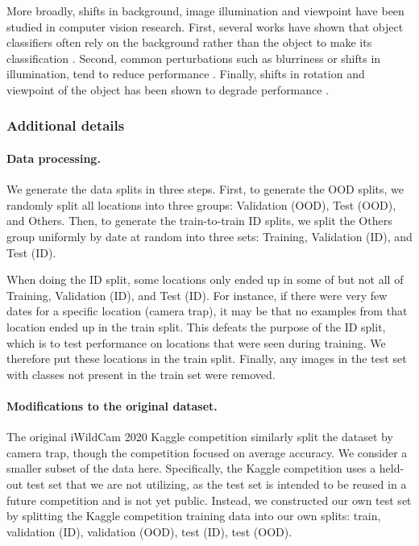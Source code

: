 More broadly, shifts in background, image illumination and viewpoint have been studied in computer vision research. First, several works have shown that object classifiers often rely on the background rather than the object to make its classification \citep{rosenfeld2018elephant, shetty2019not, xiao2020noise}. Second, common perturbations such as blurriness or shifts in illumination, tend to reduce performance \citep{dodge2017study, temel2018cure, hendrycks2019benchmarking}.
Finally, shifts in rotation and viewpoint of the object has been shown to degrade performance \citep{barbu2019objectnet}.


\subsubsection{Additional details}\label{sec:app_iwildcam_details}
\paragraph{Data processing.}
We generate the data splits in three steps. First, to generate the OOD splits, we randomly split all locations into three groups: Validation (OOD), Test (OOD), and Others. Then, to generate the train-to-train ID splits, we split the Others group uniformly by date at random into three sets: Training, Validation (ID), and Test (ID).

When doing the ID split, some locations only ended up in some of but not all of Training, Validation (ID), and Test (ID). For instance, if there were very few dates for a specific location (camera trap), it may be that no examples from that location ended up in the train split. This defeats the purpose of the ID split, which is to test performance on locations that were seen during training. We therefore put these locations in the train split. Finally, any images in the test set with classes not present in the train set were  removed.

\paragraph{Modifications to the original dataset.}
The original iWildCam 2020 Kaggle competition similarly split the dataset by camera trap, though the competition focused on average accuracy. We consider a smaller subset of the data here.
Specifically, the Kaggle competition uses a held-out test set that we are not utilizing, as the test set is intended to be reused in a future competition and is not yet public.
Instead, we constructed our own test set by splitting the Kaggle competition training data into our own splits: train, validation (ID), validation (OOD), test (ID), test (OOD).

